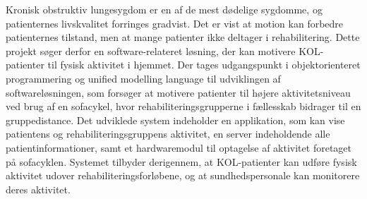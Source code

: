 
Kronisk obstruktiv lungesygdom er en af de mest dødelige sygdomme, og patienternes livskvalitet forringes gradvist. Det er vist at motion kan forbedre patienternes tilstand, men at mange patienter ikke deltager i rehabilitering. Dette projekt søger derfor en software-relateret løsning, der kan motivere KOL-patienter til fysisk aktivitet i hjemmet. Der tages udgangspunkt i objektorienteret programmering og unified modelling language til udviklingen af softwareløsningen, som forsøger at motivere patienter til højere aktivitetsniveau ved brug af en sofacykel, hvor rehabiliteringsgrupperne i fællesskab bidrager til en gruppedistance. Det udviklede system indeholder en applikation, som kan vise patientens og rehabiliteringsgruppens aktivitet, en server indeholdende alle patientinformationer, samt et hardwaremodul til optagelse af aktivitet foretaget på sofacyklen. Systemet tilbyder derigennem, at KOL-patienter kan udføre fysisk aktivitet udover rehabiliteringsforløbene, og at sundhedspersonale kan monitorere deres aktivitet. %